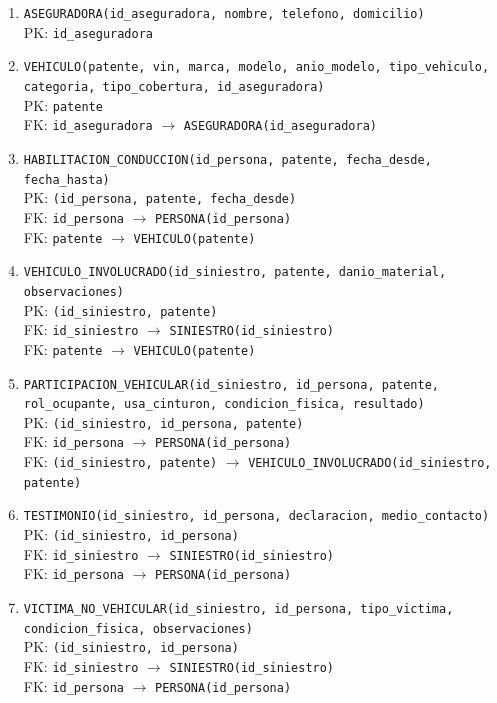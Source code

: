 \documentclass[12pt,a4paper]{article}
\begin{document}
\begin{enumerate}[leftmargin=*]
    \item \texttt{ASEGURADORA(id\_aseguradora, nombre, telefono, domicilio)}\\
    PK: \texttt{id\_aseguradora}

    \item \texttt{VEHICULO(patente, vin, marca, modelo, anio\_modelo, tipo\_vehiculo, categoria, tipo\_cobertura, id\_aseguradora)}\\
    PK: \texttt{patente}\\
    FK: \texttt{id\_aseguradora} $\rightarrow$ \texttt{ASEGURADORA(id\_aseguradora)}

    \item \texttt{HABILITACION\_CONDUCCION(id\_persona, patente, fecha\_desde, fecha\_hasta)}\\
    PK: \texttt{(id\_persona, patente, fecha\_desde)}\\
    FK: \texttt{id\_persona} $\rightarrow$ \texttt{PERSONA(id\_persona)}\\
    FK: \texttt{patente} $\rightarrow$ \texttt{VEHICULO(patente)}

    \item \texttt{VEHICULO\_INVOLUCRADO(id\_siniestro, patente, danio\_material, observaciones)}\\
    PK: \texttt{(id\_siniestro, patente)}\\
    FK: \texttt{id\_siniestro} $\rightarrow$ \texttt{SINIESTRO(id\_siniestro)}\\
    FK: \texttt{patente} $\rightarrow$ \texttt{VEHICULO(patente)}

    \item \texttt{PARTICIPACION\_VEHICULAR(id\_siniestro, id\_persona, patente, rol\_ocupante, usa\_cinturon, condicion\_fisica, resultado)}\\
    PK: \texttt{(id\_siniestro, id\_persona, patente)}\\
    FK: \texttt{id\_persona} $\rightarrow$ \texttt{PERSONA(id\_persona)}\\
    FK: \texttt{(id\_siniestro, patente)} $\rightarrow$ \texttt{VEHICULO\_INVOLUCRADO(id\_siniestro, patente)}

    \item \texttt{TESTIMONIO(id\_siniestro, id\_persona, declaracion, medio\_contacto)}\\
    PK: \texttt{(id\_siniestro, id\_persona)}\\
    FK: \texttt{id\_siniestro} $\rightarrow$ \texttt{SINIESTRO(id\_siniestro)}\\
    FK: \texttt{id\_persona} $\rightarrow$ \texttt{PERSONA(id\_persona)}

    \item \texttt{VICTIMA\_NO\_VEHICULAR(id\_siniestro, id\_persona, tipo\_victima, condicion\_fisica, observaciones)}\\
    PK: \texttt{(id\_siniestro, id\_persona)}\\
    FK: \texttt{id\_siniestro} $\rightarrow$ \texttt{SINIESTRO(id\_siniestro)}\\
    FK: \texttt{id\_persona} $\rightarrow$ \texttt{PERSONA(id\_persona)}
\end{enumerate}
\end{document}
